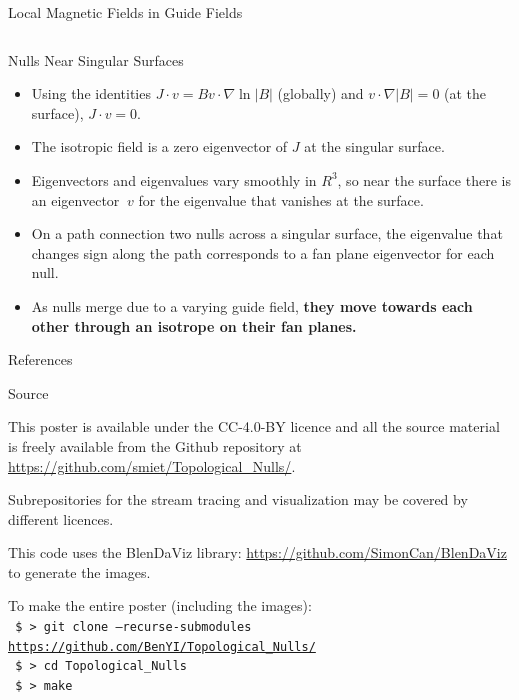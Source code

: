 \documentclass[final]{beamer}
\newlength{\onecolwid}
\newlength{\twocolwid}
\begin{document}
\begin{frame}[t]
\begin{columns}[t]
\begin{column}{\twocolwid}
\begin{block}{\huge{Local Magnetic Fields in Guide Fields}}
\begin{columns}[t,totalwidth=\twocolwid]
\begin{column}{\onecolwid}
\begin{block}{Nulls Near Singular Surfaces}
  \begin{itemize}
    \item Using the identities $J\cdot v=B v\cdot \nabla \ln|B|$ (globally) and $v\cdot \nabla |B|=0$ (at the surface), $J\cdot v=0$.
    \item The isotropic field is a zero eigenvector of $J$ at the singular surface.
    \item Eigenvectors and eigenvalues vary smoothly in $R^3$,
      so near the surface there is an eigenvector $~v$ for the eigenvalue that vanishes at the surface.
    \item On a path connection two nulls across a singular surface,
      the eigenvalue that changes sign along the path corresponds to
      a fan plane eigenvector for each null.
    \item As nulls merge due to a varying guide field,
      \textbf{they move towards each other through an isotrope on their fan planes.}
  \end{itemize}
\end{block}

\vspace{4in}

\begin{block}{\huge References}

\nocite{*} %
\small{
\vspace{0.75in}}

\end{block}

\begin{block}{Source}
\begin{centering}
    \hfill
    \hfill
\end{centering}

	\vspace{1cm}
This poster is available under the  CC-4.0-BY  licence and all the source material is freely
available from the Github repository at \url{https://github.com/smiet/Topological_Nulls/}.

Subrepositories for the stream tracing and visualization may be covered by different licences. 

This code uses the BlenDaViz library: \url{https://github.com/SimonCan/BlenDaViz} to generate the images. 

    To make the entire poster (including the images):\\
\texttt{
	\$ > git clone --recurse-submodules  \url{https://github.com/BenYI/Topological_Nulls/}}\\
\texttt{
    \$ > cd Topological\_Nulls\\
  }
\texttt{
    \$ > make
  }



\end{block}
\end{column}
\end{columns}
\end{block}
\end{column}
\end{columns}
\end{frame}
\end{document}

